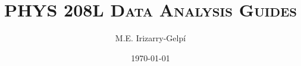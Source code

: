 \documentclass[letterpaper, 12pt]{report}
\begin{document}
\title{\textsc{PHYS 208L Data Analysis Guides}}
\author{M.E. Irizarry-Gelp\'{i}}
\date{\today}
\maketitle
\tableofcontents












\end{document}
